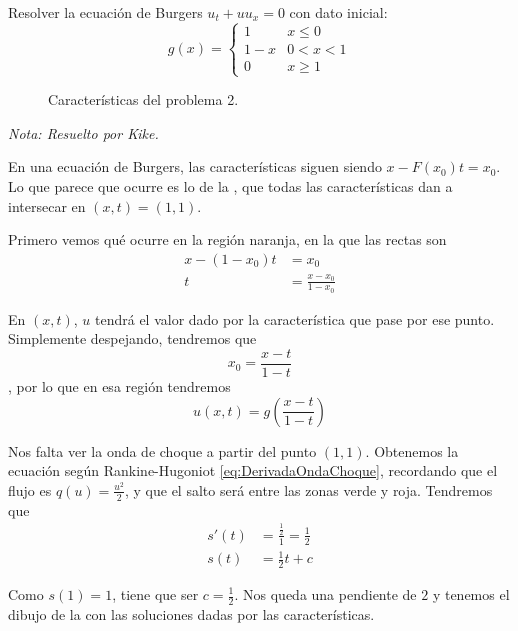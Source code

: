 \begin{problem}[2] Resolver la ecuación de Burgers $u_t + uu_x = 0$ con dato inicial:
	\[ g(x) =
	\begin{cases}
		1 & x \leq 0 \\
		1-x & 0 < x < 1 \\
		0 & x \geq 1
	\end{cases} \]

	\solution

	\begin{figure}[hbtp]
	\centering
	\caption{Características del problema 2.}
	\label{fig:Hoja1:E2}
	\end{figure}

	\textit{Nota: Resuelto por Kike.}

	En una ecuación de Burgers, las características siguen siendo $x-F(x_0) t = x_0$. Lo que parece que ocurre es lo de la , que todas las características dan a intersecar en $(x,t) = (1,1)$.

	Primero vemos qué ocurre en la región naranja, en la que las rectas son \begin{align*}
	x - (1 - x_0) t  &= x_0 \\
	t &= \frac{x - x_0}{1-x_0}
	\end{align*}

	En $(x,t)$, $u$ tendrá el valor dado por la característica que pase por ese punto. Simplemente despejando, tendremos que \[ x_0 = \frac{x-t}{1-t} \], por lo que en esa región tendremos \[ u(x,t) = g\left(\frac{x-t}{1-t}\right) \]

	Nos falta ver la onda de choque a partir del punto $(1,1)$. Obtenemos la ecuación según Rankine-Hugoniot \eqref{eq:DerivadaOndaChoque}, recordando que el flujo es $q(u) = \frac{u^2}{2}$, y que el salto será entre las zonas verde y roja. Tendremos que \begin{align*}
	s'(t) &= \frac{\frac{1}{2}}{1} = \frac{1}{2} \\
	s(t) &= \frac{1}{2}t + c
	\end{align*}

	Como $s(1) = 1$, tiene que ser $c = \frac{1}{2}$. Nos queda una pendiente de $2$ y tenemos el dibujo de la  con las soluciones dadas por las características.

\end{problem}

